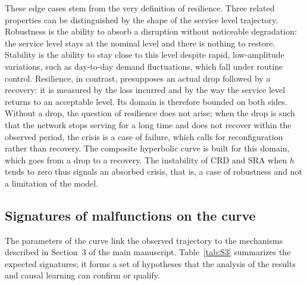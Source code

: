 These edge cases stem from the very definition of resilience. Three related properties can be distinguished by the shape of the service level trajectory. Robustness is the ability to absorb a disruption without noticeable degradation: the service level stays at the nominal level and there is nothing to restore. Stability is the ability to stay close to this level despite rapid, low-amplitude variations, such as day-to-day demand fluctuations, which fall under routine control. Resilience, in contrast, presupposes an actual drop followed by a recovery: it is measured by the loss incurred and by the way the service level returns to an acceptable level. Its domain is therefore bounded on both sides. Without a drop, the question of resilience does not arise; when the drop is such that the network stops serving for a long time and does not recover within the observed period, the crisis is a case of failure, which calls for reconfiguration rather than recovery. The composite hyperbolic curve \citep{rahiel2026in4pl} is built for this domain, which goes from a drop to a recovery. The instability of CRD and SRA when $h$ tends to zero thus signals an absorbed crisis, that is, a case of robustness and not a limitation of the model.

\subsection{Signatures of malfunctions on the curve}
\label{sec:S4.4}

The parameters of the curve link the observed trajectory to the mechanisms described in Section~3 of the main manuscript. Table~\ref{tab:S3} summarizes the expected signatures; it forms a set of hypotheses that the analysis of the results and causal learning can confirm or qualify.

